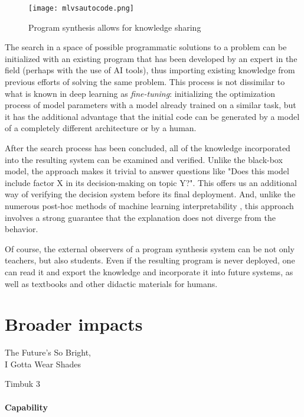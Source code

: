 \begin{figure}[H]
    \centering
    \texttt{[image: mlvsautocode.png]}
    \caption{Program synthesis allows for knowledge sharing}
    \label{fig:mlvsautocode}
\end{figure}

The search in a space of possible programmatic solutions to a problem can be initialized with an existing program that has been developed by an expert in the field (perhaps with the  use of AI tools), thus \textcolor{accent}{importing existing knowledge} from previous efforts of solving the same problem.
This process is not dissimilar to what is known in deep learning as \emph{fine-tuning}: initializing the optimization process of model parameters with a model already trained on a similar task, but it has the additional advantage that the initial code can be generated by a model of a completely different architecture or by a human.

After the search process has been concluded, all of the knowledge incorporated into the resulting system can be \textcolor{accent}{examined and verified}. 
Unlike the black-box model, the approach makes it trivial to answer questions like "Does this model include factor X in its decision-making on topic Y?".
This offers us an additional way of verifying the decision system before its final deployment. 
And, unlike the numerous post-hoc methods of machine learning interpretability \cite{linardatosExplainableAiReview2020}, this approach involves a strong guarantee that the explanation does not diverge from the behavior.

Of course, the external observers of a program synthesis system can be not only teachers, but also students. 
Even if the resulting program is never deployed, one can read it and \textcolor{accent}{export the knowledge} and incorporate it into future systems, as well as textbooks and other didactic materials for humans.

\newpage
\section{Broader impacts}
\label{sec:impacts}

\epigraph{The Future's So Bright, \\ I Gotta Wear Shades}{Timbuk 3}

\paragraph{Capability}

